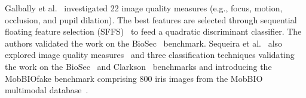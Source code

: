 


Galbally et al.~\cite{Galbally:ICB:2012} investigated 22 image quality measures (e.g., focus, motion, occlusion, and pupil dilation).
The best features are selected through sequential floating feature selection (SFFS)~\cite{Pudil:PRL:1994} to feed a quadratic discriminant classifier. The authors validated the work on the BioSec~\cite{Fierrez-Aguilar:2007,Ruiz-Albacete:BIOID:2008} benchmark. Sequeira et al.~\cite{Sequeira:VISAPP:2014} 
also explored image quality measures~\cite{Galbally:ICB:2012} and three classification techniques validating the work on the BioSec~\cite{Fierrez-Aguilar:2007,Ruiz-Albacete:BIOID:2008} and Clarkson~\cite{LivDet:Iris:2013} benchmarks and introducing the MobBIOfake benchmark comprising 800 iris images from the MobBIO multimodal database~\cite{Sequeira:VISAPP:2014:base}.

